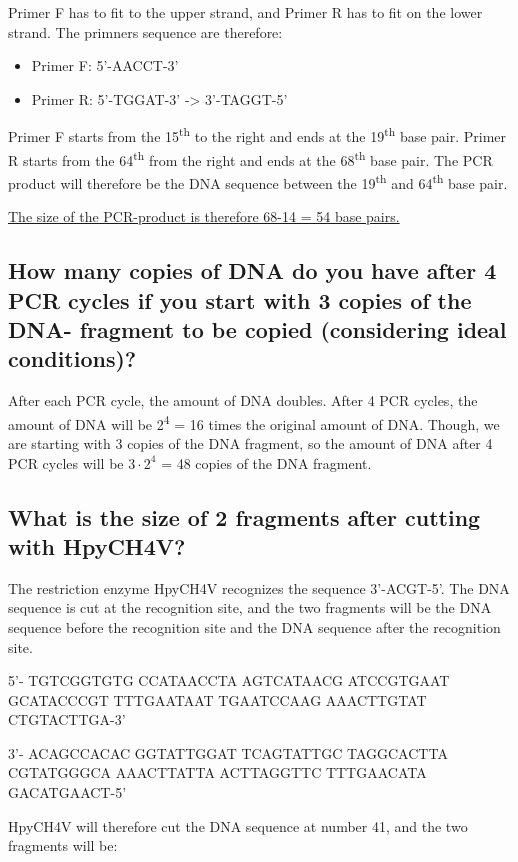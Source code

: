 Primer F has to fit to the upper strand, and Primer R has to fit on the lower strand. The primners sequence are therefore:
\begin{itemize}
    \item Primer F: 5'-AACCT-3' 
    \item Primer R: 5'-TGGAT-3' -> 3'-TAGGT-5'
\end{itemize}

Primer F starts from the 15\textsuperscript{th} to the right and ends at the 19\textsuperscript{th} base pair. Primer R starts from the 64\textsuperscript{th} from the right and ends at the 68\textsuperscript{th} base pair. The PCR product will therefore be the DNA sequence between the 19\textsuperscript{th} and 64\textsuperscript{th} base pair.

\underline{The size of the PCR-product is therefore 68-14 = 54 base pairs.}

\subsection{How many copies of DNA do you have after 4 PCR cycles if you start with 3 copies of the DNA- fragment to be copied (considering ideal conditions)?}
After each PCR cycle, the amount of DNA doubles. After 4 PCR cycles, the amount of DNA will be 2\textsuperscript{4} = 16 times the original amount of DNA.
Though, we are starting with 3 copies of the DNA fragment, so the amount of DNA after 4 PCR cycles will be $3 \cdot 2^4$ = 48 copies of the DNA fragment.

\subsection{What is the size of 2 fragments after cutting with HpyCH4V?}
The restriction enzyme HpyCH4V recognizes the sequence 3'-ACGT-5'. The DNA sequence is cut at the recognition site, and the two fragments will be the DNA sequence before the recognition site and the DNA sequence after the recognition site.

5'- TGTCGGTGTG CCATAACCTA AGTCATAACG ATCCGTGAAT GCATACCCGT TTTGAATAAT TGAATCCAAG AAACTTGTAT CTGTACTTGA-3'

3'- ACAGCCACAC GGTATTGGAT TCAGTATTGC TAGGCACTTA CGTATGGGCA AAACTTATTA ACTTAGGTTC TTTGAACATA GACATGAACT-5'
\vspace{1em}

HpyCH4V will therefore cut the DNA sequence at number 41, and the two fragments will be:

